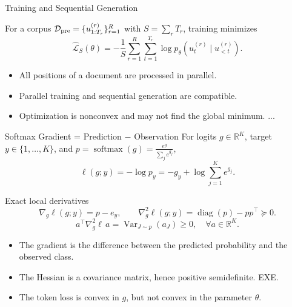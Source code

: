 \documentclass[aspectratio=169,11pt]{beamer}
\newcommand{\R}{\mathbb{R}}
\newcommand{\cD}{\mathcal{D}}
\DeclareMathOperator{\softmax}{softmax}
\begin{document}
\begin{frame}{ Training and Sequential Generation}

For a corpus $\cD_{\rm pre}=\{u_{1:T_r}^{(r)}\}_{r=1}^R$ with
$S=\sum_rT_r$, training minimizes
\[
 \widehat{\mathcal L}_S(\theta)
 =-\frac1S\sum_{r=1}^R\sum_{t=1}^{T_r}
 \log p_\theta\!\left(u_t^{(r)}\mid u_{<t}^{(r)}\right).
\]
\begin{itemize}
  \item All positions of a document are processed in parallel. 
  \item Parallel training and sequential generation are compatible. 
  \item Optimization is nonconvex and may not find the global minimum. ... 
\end{itemize}

\end{frame}



\begin{frame}{Softmax Gradient = Prediction $-$ Observation}
For logits $g\in\R^K$, target $y\in \{1,\ldots,K\}$, and $p=\softmax(g) = \frac{e^g}{\sum_j e^{g_j}}$,
\[
 \ell(g;y)= -\log p_y  
 =  -g_y+\log\sum_{j=1}^K e^{g_j}.
\]

\begin{block}{Exact local derivatives}
\[
 \nabla_g\ell(g;y)=p-e_y,
 \qquad
 \nabla_g^2\ell(g;y)=\operatorname{diag}(p)-pp^\top\succeq0.
\]
\[
 a^\top\nabla_g^2\ell\,a
 =\operatorname{Var}_{J\sim p}(a_J)\ge0, \quad \forall a\in\R^K.
\]
\end{block}
\begin{itemize}
  \item The gradient is the difference between the predicted probability and the observed class.
  \item The Hessian is a covariance matrix, hence positive semidefinite. EXE. 
  \item The token loss is convex in $g$, but not convex in the parameter $\theta$.
\end{itemize}

\end{frame}
\end{document}
